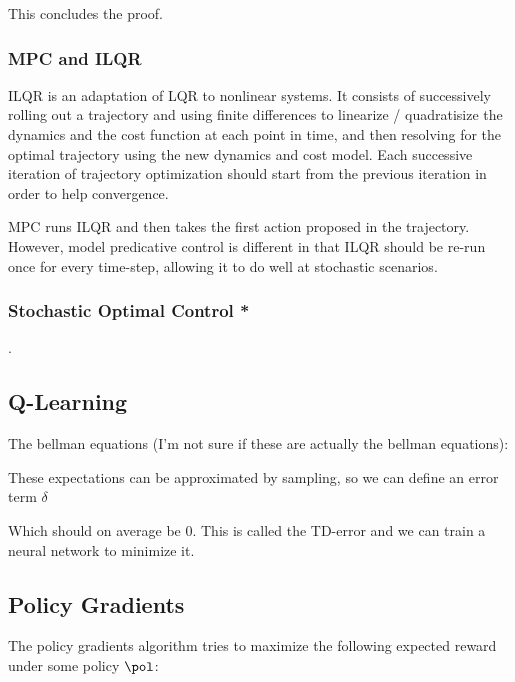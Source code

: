 \documentclass[12pt]{article}
\begin{document}
This concludes the proof.

\subsubsection{MPC and ILQR}

ILQR is an adaptation of LQR to nonlinear systems. It consists of successively rolling out a trajectory and using finite differences to linearize / quadratisize the dynamics and the cost function at each point in time, and then resolving for the optimal trajectory using the new dynamics and cost model. Each successive iteration of trajectory optimization should start from the previous iteration in order to help convergence. 

MPC runs ILQR and then takes the first action proposed in the trajectory. However, model predicative control is different in that ILQR should be re-run once for every time-step, allowing it to do well at stochastic scenarios. 

\subsubsection{Stochastic Optimal Control *}
.
\subsection{Q-Learning}

The bellman equations (I'm not sure if these are actually the bellman equations):


These expectations can be approximated by sampling, so we can define an error term $\delta$


Which should on average be 0. This is called the TD-error and we can train a neural network to minimize it.

\subsection{Policy Gradients}

The policy gradients algorithm tries to maximize the following expected reward under some policy $\pol$:
\end{document}
